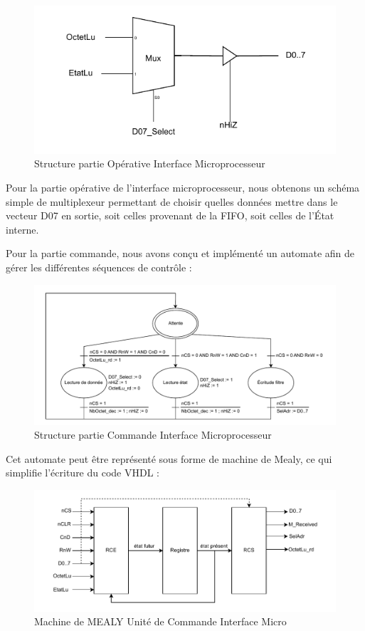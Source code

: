 \begin{figure}[H]
    \centering
    \includegraphics[width=0.8\linewidth]{images/inter/Structure_Interface_Micro.pdf}
    \caption{Structure partie Opérative Interface Microprocesseur}
    \label{fig:placeholder}
\end{figure}

Pour la partie opérative de l'interface microprocesseur, nous obtenons un schéma simple de 
multiplexeur permettant de choisir quelles données mettre dans le vecteur D07 en sortie, 
soit celles provenant de la FIFO, soit celles de l'État interne.
\newline

Pour la partie commande, nous avons conçu et implémenté un automate afin de gérer les différentes 
séquences de contrôle : 
\newline


\begin{figure}[H]
    \centering
    \includegraphics[width=0.8\linewidth]{images/inter/Automate_Interface_Micro.pdf}
    \caption{Structure partie Commande Interface Microprocesseur}
    \label{fig:placeholder}
\end{figure}

Cet automate peut être représenté sous forme de machine de Mealy, ce qui simplifie l'écriture du code VHDL : 

\begin{figure}[H]
    \centering
    \includegraphics[width=0.8\linewidth]{images/inter/MEALY_Interface_Micro.pdf}
    \caption{Machine de MEALY Unité de Commande Interface Micro}
    \label{fig:placeholder}
\end{figure}

